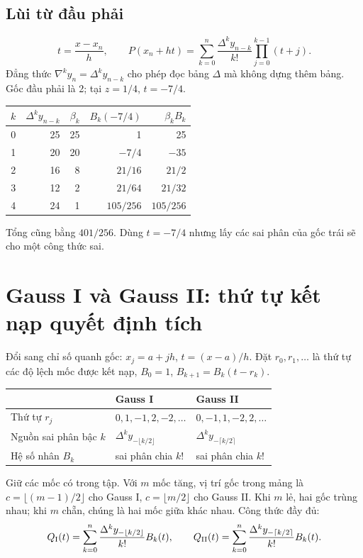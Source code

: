 \subsection{Lùi từ đầu phải}
\[
 t=\frac{x-x_n}{h},\qquad
 P(x_n+ht)=\sum_{k=0}^n\frac{\Delta^ky_{n-k}}{k!}
              \prod_{j=0}^{k-1}(t+j).
\]
Đẳng thức $\nabla^ky_n=\Delta^ky_{n-k}$ cho phép đọc bảng $\Delta$ mà không dựng thêm bảng. Gốc đầu phải là 2; tại $z=1/4$, $t=-7/4$.
\begin{center}\small
\begin{tabular}{@{}rrrrr@{}}\toprule
$k$ & $\Delta^ky_{n-k}$ & $\beta_k$ & $B_k(-7/4)$ & $\beta_kB_k$\\\midrule
0 & 25 & 25 & 1 & 25\\
1 & 20 & 20 & $-7/4$ & $-35$\\
2 & 16 & 8 & $21/16$ & $21/2$\\
3 & 12 & 2 & $21/64$ & $21/32$\\
4 & 24 & 1 & $105/256$ & $105/256$\\\bottomrule
\end{tabular}\end{center}
Tổng cũng bằng $401/256$. Dùng $t=-7/4$ nhưng lấy các sai phân của gốc trái sẽ cho một công thức sai.

\section{Gauss I và Gauss II: thứ tự kết nạp quyết định tích}
\label{sec:gauss-central}
Đổi sang chỉ số quanh gốc: $x_j=a+jh$, $t=(x-a)/h$. Đặt $r_0,r_1,\ldots$ là thứ tự các độ lệch mốc được kết nạp, $B_0=1$, $B_{k+1}=B_k(t-r_k)$.
\begin{center}\small
\begin{tabular}{@{}lll@{}}\toprule
 & Gauss I & Gauss II\\\midrule
Thứ tự $r_j$ & $0,1,-1,2,-2,\ldots$ & $0,-1,1,-2,2,\ldots$\\
Nguồn sai phân bậc $k$ & $\Delta^ky_{-\lfloor k/2\rfloor}$ & $\Delta^ky_{-\lceil k/2\rceil}$\\
Hệ số nhân $B_k$ & sai phân chia $k!$ & sai phân chia $k!$\\\bottomrule
\end{tabular}\end{center}
Giữ các mốc có trong tập. Với $m$ mốc tăng, vị trí gốc trong mảng là $c=\lfloor(m-1)/2\rfloor$ cho Gauss I, $c=\lfloor m/2\rfloor$ cho Gauss II. Khi $m$ lẻ, hai gốc trùng nhau; khi $m$ chẵn, chúng là hai mốc giữa khác nhau. Công thức đầy đủ:
\[
 Q_{\rm I}(t)=\sum_{k=0}^n\frac{\Delta^ky_{-\lfloor k/2\rfloor}}{k!}B_k(t),\qquad
 Q_{\rm II}(t)=\sum_{k=0}^n\frac{\Delta^ky_{-\lceil k/2\rceil}}{k!}B_k(t).
\]

